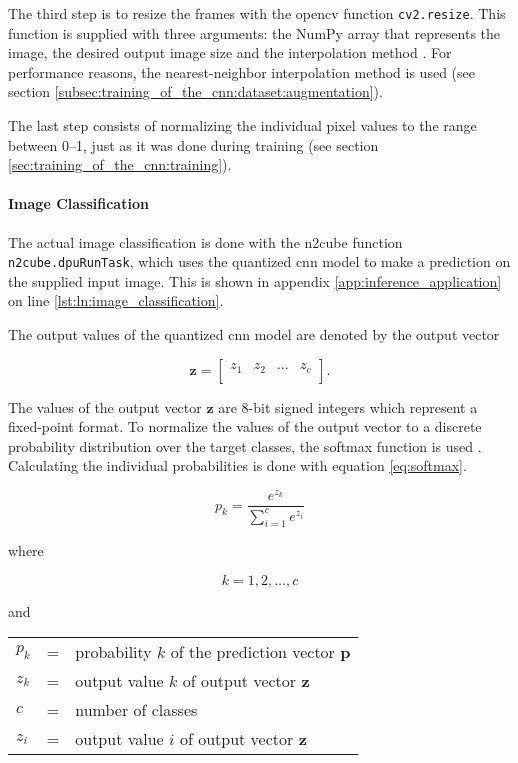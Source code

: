 The third step is to resize the frames with the \acrshort{opencv} function \texttt{cv2.resize}.
This function is supplied with three arguments: the NumPy array that represents the image, the desired output image size and the interpolation method \cite{training_opencv_resize}.
For performance reasons, the nearest-neighbor interpolation method is used (see section \ref{subsec:training_of_the_cnn:dataset:augmentation}).

The last step consists of normalizing the individual pixel values to the range between \numrange{0}{1}, just as it was done during training (see section \ref{sec:training_of_the_cnn:training}).

\paragraph{Image Classification}
The actual image classification is done with the \acrshort{n2cube} function \texttt{n2cube.dpuRunTask}, which uses the quantized \acrshort{cnn} model to make a prediction on the supplied input image.
This is shown in appendix \ref{app:inference_application} on line \ref{lst:ln:image_classification}.

The output values of the quantized \acrshort{cnn} model are denoted by the output vector

\begin{equation}
  \boldsymbol{z} =
  \begin{bmatrix}
    z_1 & z_2 & \dots & z_c \\
  \end{bmatrix}.
  \label{eq:output_vector}
\end{equation}

The values of the output vector $\boldsymbol{z}$ are 8-bit signed integers which represent a fixed-point format.
To normalize the values of the output vector to a discrete probability distribution over the target classes, the softmax function is used \cite{inf_softmax}.
Calculating the individual probabilities is done with equation \ref{eq:softmax}.

\begin{equation}
  p_k = \frac{e^{z_k}}{\sum\limits_{i=1}^{c} e^{z_i}}
  \label{eq:softmax}
\end{equation}

where

\[
  k = 1, 2, \dots, c
\]

and

\begin{tabular}{lll}
  $p_k$ & = & probability $k$ of the prediction vector $\boldsymbol{p}$ \\
  $z_k$ & = & output value $k$ of output vector $\boldsymbol{z}$ \\
  $c$ & = & number of classes \\
  $z_i$ & = & output value $i$ of output vector $\boldsymbol{z}$ \\
\end{tabular}
\\

